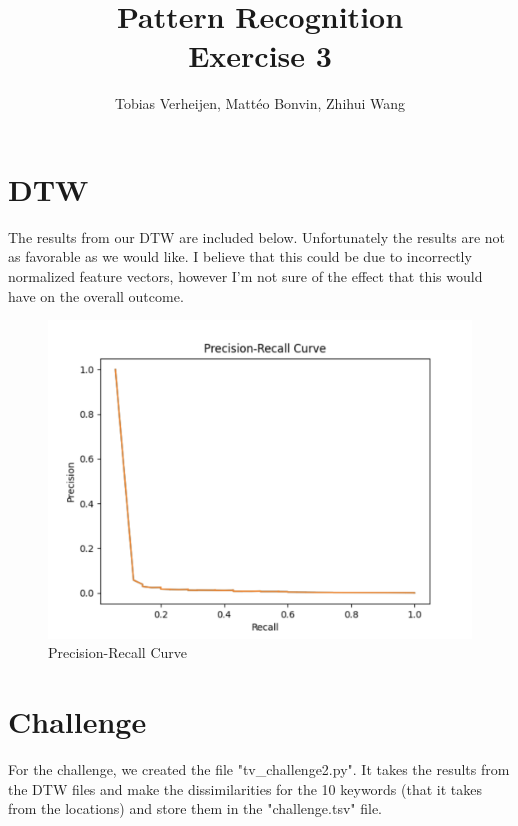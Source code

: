 \documentclass{article}
\title{Pattern Recognition \\\Large{Exercise 3}}
\author{Tobias Verheijen, Mattéo Bonvin, Zhihui Wang}
\date{}
\begin{document}
\maketitle

\section{DTW}

The results from our DTW are included below. Unfortunately the results are not as favorable as we would like. I believe that this could be due to incorrectly normalized feature vectors, however I'm not sure of the effect that this would have on the overall outcome.

\begin{figure}
    \centering
    \includegraphics[width=\linewidth]{Precision-Recall.png}
    \caption{Precision-Recall Curve}
    \label{fig:enter-label}
\end{figure}

\section{Challenge}

For the challenge, we created the file "tv_challenge2.py". It takes the results from the DTW files and make the dissimilarities for the 10 keywords (that it takes from the locations) and store them in the "challenge.tsv" file.
\end{document}
